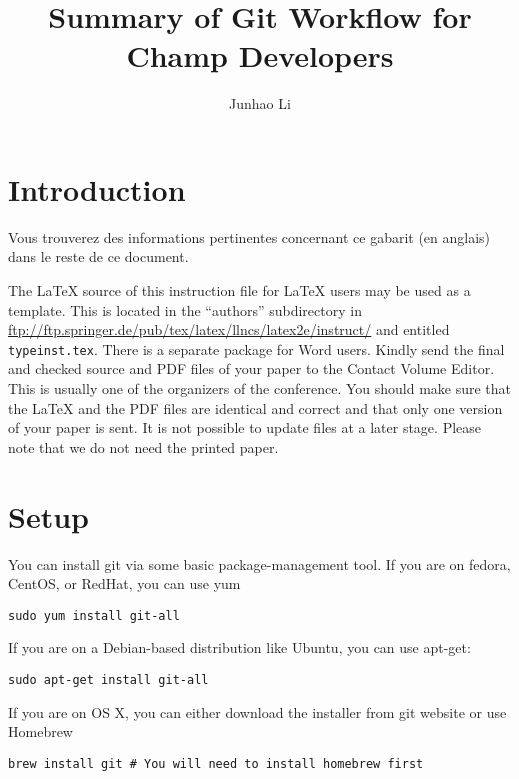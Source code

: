 \documentclass[runningheads,letterpaper]{llncs}
\begin{document}
\mainmatter
\title{Summary of Git Workflow for Champ Developers}

\author{Junhao Li}

\maketitle

\section*{Introduction}
Vous trouverez des informations pertinentes concernant ce gabarit (en anglais)
dans le reste de ce document.

The \LaTeX{} source of this instruction file for \LaTeX{} users may be
used as a template. This is
located in the ``authors'' subdirectory in
\url{ftp://ftp.springer.de/pub/tex/latex/llncs/latex2e/instruct/} and
entitled \texttt{typeinst.tex}. There is a separate package for Word
users. Kindly send the final and checked source
and PDF files of your paper to the Contact Volume Editor. This is
usually one of the organizers of the conference. You should make sure
that the \LaTeX{} and the PDF files are identical and correct and that
only one version of your paper is sent. It is not possible to update
files at a later stage. Please note that we do not need the printed
paper.



\section{Setup}

You can install git via some basic package-management tool.
If you are on fedora, CentOS, or RedHat, you can use yum
\begin{verbatim}
sudo yum install git-all
\end{verbatim}
If you are on a Debian-based distribution like Ubuntu, you can use apt-get:
\begin{verbatim}
sudo apt-get install git-all
\end{verbatim}
If you are on OS X, you can either download the installer from git website or use Homebrew
\begin{verbatim}
brew install git # You will need to install homebrew first
\end{verbatim}
\end{document}
